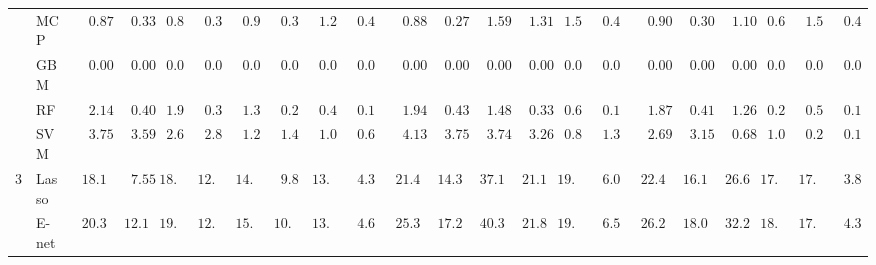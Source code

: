 \begin{tabular}{llllllllllllllllllllll}
	& MCP  & $\phantom{00}0.87$ & $\phantom{00}0.33$ & $\phantom{0}0.89$ & $\phantom{0}0.34$ & $\phantom{0}0.96$ & $\phantom{0}0.36$ & $\phantom{0}1.26$ & $\phantom{0}0.42$ & $\phantom{00}0.88$ & $\phantom{00}0.27$ & $\phantom{00}1.59$ & $\phantom{00}1.31$ & $\phantom{0}1.53$ & $\phantom{0}0.48$ & $\phantom{00}0.90$ & $\phantom{00}0.30$ & $\phantom{00}1.10$ & $\phantom{0}0.63$ & $\phantom{0}1.51$ & $\phantom{0}0.46$ \\
	& GBM  & $\phantom{00}0.00$ & $\phantom{00}0.00$ & $\phantom{0}0.00$ & $\phantom{0}0.00$ & $\phantom{0}0.00$ & $\phantom{0}0.00$ & $\phantom{0}0.00$ & $\phantom{0}0.00$ & $\phantom{00}0.00$ & $\phantom{00}0.00$ & $\phantom{00}0.00$ & $\phantom{00}0.00$ & $\phantom{0}0.00$ & $\phantom{0}0.00$ & $\phantom{00}0.00$ & $\phantom{00}0.00$ & $\phantom{00}0.00$ & $\phantom{0}0.00$ & $\phantom{0}0.00$ & $\phantom{0}0.00$ \\
	& RF  & $\phantom{00}2.14$ & $\phantom{00}0.40$ & $\phantom{0}1.91$ & $\phantom{0}0.38$ & $\phantom{0}1.31$ & $\phantom{0}0.23$ & $\phantom{0}0.45$ & $\phantom{0}0.10$ & $\phantom{00}1.94$ & $\phantom{00}0.43$ & $\phantom{00}1.48$ & $\phantom{00}0.33$ & $\phantom{0}0.61$ & $\phantom{0}0.14$ & $\phantom{00}1.87$ & $\phantom{00}0.41$ & $\phantom{00}1.26$ & $\phantom{0}0.25$ & $\phantom{0}0.51$ & $\phantom{0}0.12$ \\
	& SVM  & $\phantom{00}3.75$ & $\phantom{00}3.59$ & $\phantom{0}2.65$ & $\phantom{0}2.83$ & $\phantom{0}1.23$ & $\phantom{0}1.44$ & $\phantom{0}1.01$ & $\phantom{0}0.61$ & $\phantom{00}4.13$ & $\phantom{00}3.75$ & $\phantom{00}3.74$ & $\phantom{00}3.26$ & $\phantom{0}0.87$ & $\phantom{0}1.38$ & $\phantom{00}2.69$ & $\phantom{00}3.15$ & $\phantom{00}0.68$ & $\phantom{0}1.02$ & $\phantom{0}0.20$ & $\phantom{0}0.11$ \\
	3 & Lasso  & $\phantom{0}18.11$ & $\phantom{00}7.55$ & $18.29$ & $12.59$ & $14.71$ & $\phantom{0}9.87$ & $13.78$ & $\phantom{0}4.35$ & $\phantom{0}21.47$ & $\phantom{0}14.38$ & $\phantom{0}37.19$ & $\phantom{0}21.15$ & $19.11$ & $\phantom{0}6.00$ & $\phantom{0}22.42$ & $\phantom{0}16.17$ & $\phantom{0}26.68$ & $17.69$ & $17.06$ & $\phantom{0}3.80$ \\
	& E-net  & $\phantom{0}20.35$ & $\phantom{0}12.10$ & $19.87$ & $12.92$ & $15.86$ & $10.46$ & $13.23$ & $\phantom{0}4.64$ & $\phantom{0}25.37$ & $\phantom{0}17.20$ & $\phantom{0}40.30$ & $\phantom{0}21.89$ & $19.82$ & $\phantom{0}6.51$ & $\phantom{0}26.27$ & $\phantom{0}18.03$ & $\phantom{0}32.27$ & $18.12$ & $17.30$ & $\phantom{0}4.35$ \\

\end{tabular}
